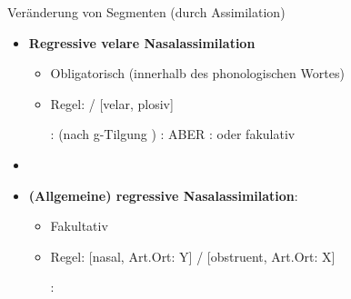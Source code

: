 %
%

\begin{frame}{Veränderung von Segmenten (durch Assimilation)}

\begin{itemize}
	\item \textbf{Regressive velare Nasalassimilation}

	\begin{itemize}
		\item Obligatorisch (innerhalb des phonologischen Wortes)
		\item Regel:  \ras \textipa{[N]} /  \underline{\quad} [velar, plosiv]

	\eal		
		\ex {}:  \ras {} (nach g-Tilgung \ras \textipa{[fy:.{\textscr}UN]})
		\ex {}:  \ras \textipa{[baNk]}
		\ex ABER :  \ras {} oder fakulativ 
	\zl
	
 	\end{itemize}


	\item[]
	\item \textbf{(Allgemeine) regressive Nasalassimilation}:

	\begin{itemize}
		\item Fakultativ
		\item Regel: [nasal, Art.Ort: Y]  /  \underline{\quad} [obstruent, Art.Ort: X]

		\ea {}:  \ras \textipa{[fYmf]}
		\z
		
	\end{itemize}		

\end{itemize}

\end{frame}




